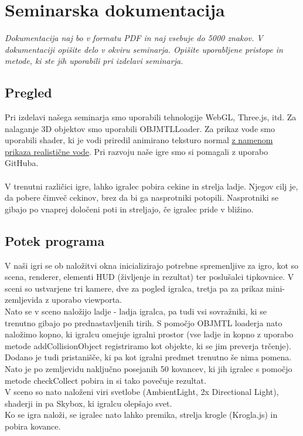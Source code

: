 \documentclass[a4paper]{article}
\begin{document}
\section{Seminarska dokumentacija}
\textit{Dokumentacija naj bo v formatu PDF in naj vsebuje do 5000 znakov. V dokumentaciji opišite delo v okviru seminarja. Opišite uporabljene pristope in metode, ki ste jih uporabili pri izdelavi seminarja. }

\subsection{Pregled}
Pri izdelavi našega seminarja smo uporabili tehnologije WebGL, Three.js\cite{wiki:Three.js}, itd. Za nalaganje 3D objektov smo uporabili OBJMTLLoader. Za prikaz vode smo uporabili shader, ki je vodi priredil animirano teksturo normal \href{http://github.com/jbouny/ocean}{z namenom prikaza realistične vode}.
Pri razvoju naše igre smo si pomagali z uporabo GitHuba. \\
\\
V trenutni različici igre, lahko igralec pobira cekine in strelja ladje. Njegov cilj je, da pobere čimveč cekinov, brez da bi ga nasprotniki potopili. Nasprotniki se gibajo po vnaprej določeni poti in streljajo, če igralec pride v bližino.


\subsection{Potek programa}
V naši igri se ob naložitvi okna inicializirajo potrebne spremenljive za igro, kot so scena, renderer, elementi HUD (življenje in rezultat) ter poslušalci tipkovnice. V sceni so ustvarjene tri kamere, dve za pogled igralca, tretja pa za prikaz mini-zemljevida z uporabo viewporta. \\
Nato se v sceno naložijo ladje - ladja igralca, pa tudi vsi sovražniki, ki se trenutno gibajo po prednastavljenih tirih. S pomočjo OBJMTL loaderja nato naložimo kopno, ki igralcu omejuje igralni prostor (vse ladje in kopno z uporabo metode addCollisionObject registriramo kot objekte, ki se jim preverja trčenje). Dodano je tudi pristanišče, ki pa kot igralni predmet trenutno še nima pomena. Nato je po zemljevidu naključno posejanih 50 kovancev, ki jih igralec s pomočjo metode checkCollect pobira in si tako povečuje rezultat. \\
V sceno so nato naloženi viri svetlobe (AmbientLight, 2x Directional Light), shaderji in pa Skybox, ki igralcu olepšajo svet.\\
Ko se igra naloži, se igralec nato lahko premika, strelja krogle (Krogla.js) in pobira kovance.
\end{document}
